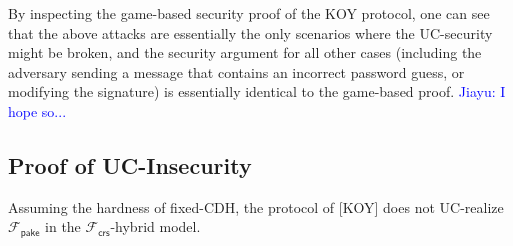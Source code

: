 \documentclass[12pt,a4paper]{article}
\def\xjy#1{\textcolor{blue}{Jiayu: #1}}
\begin{document}
By inspecting the game-based security proof of the KOY protocol, one can see that the above attacks are essentially the only scenarios where the UC-security might be broken, and the security argument for all other cases (including the adversary sending a message that contains an incorrect password guess, or modifying the signature) is essentially identical to the game-based proof. \xjy{I hope so...}

	\subsection{Proof of UC-Insecurity}

	\begin{theorem}
		Assuming the hardness of fixed-CDH, the protocol of [KOY] does not UC-realize $\mathcal{F}_\mathsf{pake}$ in the $\mathcal{F}_{\mathsf{crs}}$-hybrid model.
	\end{theorem}
\end{document}
